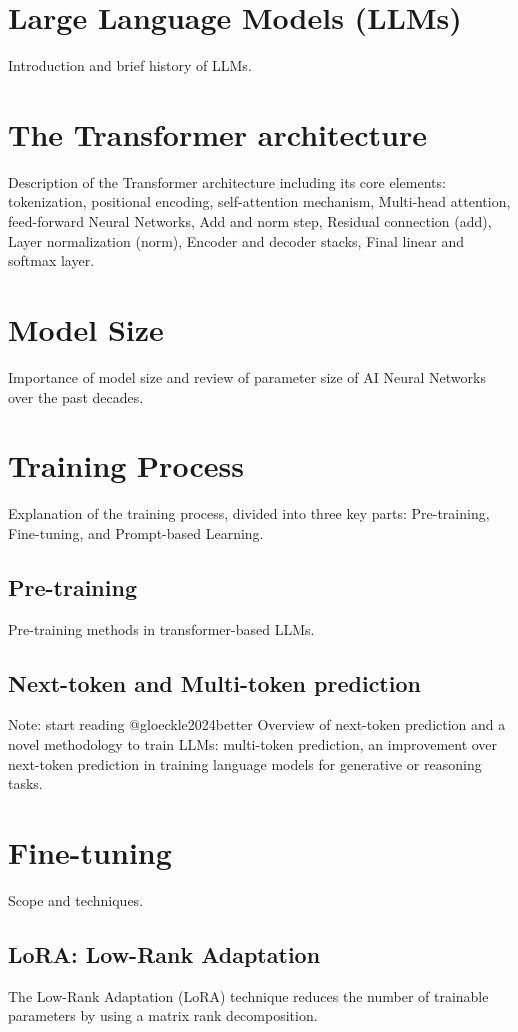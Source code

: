 \section{Large Language Models (LLMs)}
Introduction and brief history of LLMs.

\section{The Transformer architecture}
Description of the Transformer architecture including its core elements: tokenization, positional encoding, self-attention mechanism, Multi-head attention, feed-forward Neural Networks, Add and norm step, Residual connection (add), Layer normalization (norm), Encoder and decoder stacks, Final linear and softmax layer.

\section{Model Size}
Importance of model size and review of parameter size of AI Neural Networks over the past decades.

\section{Training Process}
Explanation of the training process, divided into three key parts: Pre-training, Fine-tuning, and Prompt-based Learning.

\subsection{Pre-training}
Pre-training methods in transformer-based LLMs.

\subsection{Next-token and Multi-token prediction}
Note: start reading @gloeckle2024better \newline
Overview of next-token prediction and a novel methodology to train LLMs: multi-token prediction, an improvement over next-token prediction in training language models for generative or reasoning tasks. 

\section{Fine-tuning}
Scope and techniques.

\subsection{LoRA: Low-Rank Adaptation}
The Low-Rank Adaptation (LoRA) technique reduces the number of trainable parameters by using a matrix rank decomposition.

